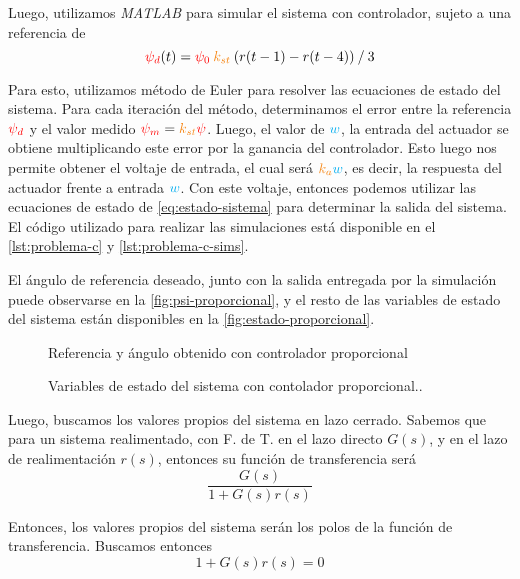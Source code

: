 Luego, utilizamos \textit{MATLAB} para simular el sistema con controlador, sujeto
a una referencia de
\begin{equation}
	\rojo{\psi_{d}}(t) = \rojo{\psi_{0}}\nara{k_{st}}\left(r(t-1) - r(t-4)\right) \mathbin{/} 3
\end{equation}

Para esto, utilizamos método de Euler para resolver las ecuaciones de estado
del sistema. Para cada iteración del método, determinamos el error entre la
referencia $\mathbin{\color{red}\psi_{d}}$ y el valor medido $\rojo{\psi_{m}} = \nara{k_{st}}\rojo{\psi}$.
Luego, el valor de $\mathbin{\color{cyan}w}$, la entrada del actuador se obtiene multiplicando
este error por la ganancia del controlador. Esto luego nos permite obtener el
voltaje de entrada, el cual será $\nara{k_{a}}\azul{w}$, es decir, la respuesta del
actuador frente a entrada $\mathbin{\color{cyan}w}$. Con este voltaje, entonces podemos utilizar
las ecuaciones de estado de \eqref{eq:estado-sistema} para determinar la salida del
sistema. El código utilizado para realizar las simulaciones está disponible en
el \autoref{lst:problema-c} y \autoref{lst:problema-c-sims}.

El ángulo de referencia deseado, junto con la salida entregada por la simulación
puede observarse en la \autoref{fig:psi-proporcional}, y el resto de las variables
de estado del sistema están disponibles en la \autoref{fig:estado-proporcional}.

\begin{figure}[h]
  \centering
  
  \caption{Referencia y ángulo obtenido con controlador proporcional}\label{fig:psi-proporcional}
\end{figure}

\begin{figure}[h]
  \centering
  
  \caption{Variables de estado del sistema con contolador proporcional..}\label{fig:estado-proporcional}
\end{figure}

\FloatBarrier

Luego, buscamos los valores propios del sistema en lazo cerrado. Sabemos que
para un sistema realimentado, con F. de T. en el lazo directo $G(s)$, y en el
lazo de realimentación $r(s)$, entonces su función de transferencia será
\begin{equation}\label{eq:fdt-lc}
    \frac{G(s)}{1 + G(s)r(s)}
\end{equation}

Entonces, los valores propios del sistema serán los polos de la función de
transferencia. Buscamos entonces
\begin{equation}
  1 + G(s)r(s) = 0
\end{equation}

